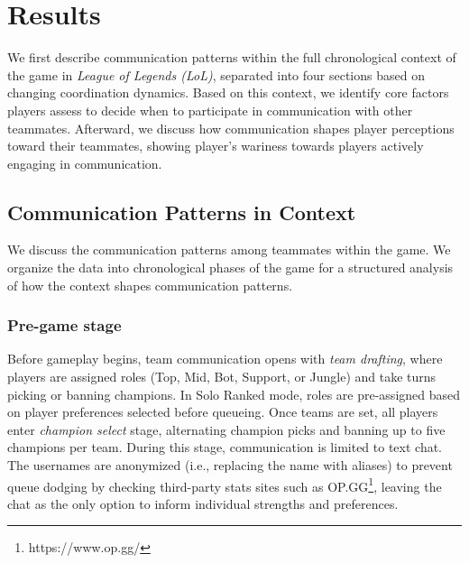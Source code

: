 \section{Results}
We first describe communication patterns within the full chronological context of the game in \textit{League of Legends (LoL)}, separated into four sections based on changing coordination dynamics. Based on this context, we identify core factors players assess to decide when to participate in communication with other teammates. Afterward, we discuss how communication shapes player perceptions toward their teammates, showing player's wariness towards players actively engaging in communication. 

\subsection{Communication Patterns in Context}

We discuss the communication patterns among teammates within the game. We organize the data into chronological phases of the game for a structured analysis of how the context shapes communication patterns. 

\subsubsection{Pre-game stage}
Before gameplay begins, team communication opens with \textit{team drafting}, where players are assigned roles (Top, Mid, Bot, Support, or Jungle) and take turns picking or banning champions. In Solo Ranked mode, roles are pre-assigned based on player preferences selected before queueing. Once teams are set, all players enter \textit{champion select} stage, alternating champion picks and banning up to five champions per team. During this stage, communication is limited to text chat. The usernames are anonymized (i.e., replacing the name with aliases) to prevent queue dodging by checking third-party stats sites such as OP.GG\footnote{https://www.op.gg/}, leaving the chat as the only option to inform individual strengths and preferences. 

